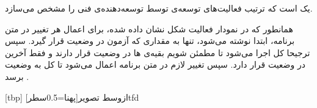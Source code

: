 
 یک  است که ترتیب فعالیت‌های توسعه‌ی 
توسط توسعه‌دهنده‌ی فنی را مشخص می‌سازد.

همانطور که در نمودار فعالیت شکل  نشان داده شده، برای
اعمال هر تغییر در متن برنامه، ابتدا  نوشته می‌شود، تنها به
مقداری که آزمون در وضعیت  قرار گیرد. سپس ترجیحا کل
 اجرا می‌شود تا مطمئن شویم بقیه‌ی ‌ها در وضعیت
 قرار دارند و فقط آخرین  در وضعیت  قرار
دارد. سپس تغییر لازم در متن برنامه اعمال می‌شود تا کل 
به وضعیت  برسد .

[tbp]
  ‌ازوسط
  ‌تصویر[پهنا=0.5‌سطر]{tfd}

